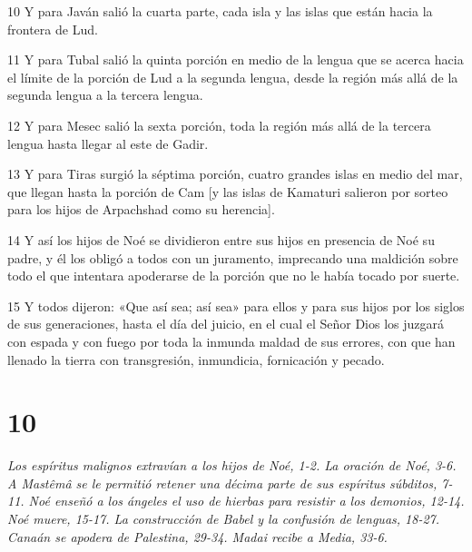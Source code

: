 \par 10 Y para Javán salió la cuarta parte, cada isla y las islas que están hacia la frontera de Lud.
\par 11 Y para Tubal salió la quinta porción en medio de la lengua que se acerca hacia el límite de la porción de Lud a la segunda lengua, desde la región más allá de la segunda lengua a la tercera lengua.
\par 12 Y para Mesec salió la sexta porción, toda la región más allá de la tercera lengua hasta llegar al este de Gadir.
\par 13 Y para Tiras surgió la séptima porción, cuatro grandes islas en medio del mar, que llegan hasta la porción de Cam [y las islas de Kamaturi salieron por sorteo para los hijos de Arpachshad como su herencia].
\par 14 Y así los hijos de Noé se dividieron entre sus hijos en presencia de Noé su padre, y él los obligó a todos con un juramento, imprecando una maldición sobre todo el que intentara apoderarse de la porción que no le había tocado por suerte.
\par 15 Y todos dijeron: «Que así sea; así sea» para ellos y para sus hijos por los siglos de sus generaciones, hasta el día del juicio, en el cual el Señor Dios los juzgará con espada y con fuego por toda la inmunda maldad de sus errores, con que han llenado la tierra con transgresión, inmundicia, fornicación y pecado.

\chapter{10}

\par \textit{Los espíritus malignos extravían a los hijos de Noé, 1-2. La oración de Noé, 3-6. A Mastêmâ se le permitió retener una décima parte de sus espíritus súbditos, 7-11. Noé enseñó a los ángeles el uso de hierbas para resistir a los demonios, 12-14. Noé muere, 15-17. La construcción de Babel y la confusión de lenguas, 18-27. Canaán se apodera de Palestina, 29-34. Madai recibe a Media, 33-6.}

